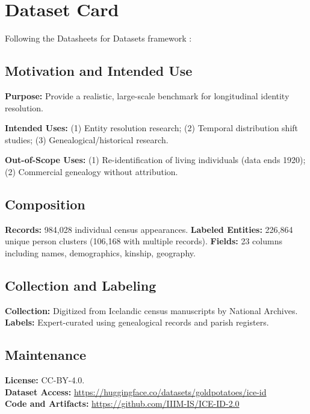 \documentclass{article}
\begin{document}


\section{Dataset Card}
\label{sec:dataset_card}

Following the Datasheets for Datasets framework \cite{gebru2021datasheets, Bender2018DataSF, Mitchell2018ModelCF}:

\subsection{Motivation and Intended Use}
\textbf{Purpose:} Provide a realistic, large-scale benchmark for longitudinal identity resolution.

\textbf{Intended Uses:} (1) Entity resolution research; (2) Temporal distribution shift studies; (3) Genealogical/historical research.

\textbf{Out-of-Scope Uses:} (1) Re-identification of living individuals (data ends 1920); (2) Commercial genealogy without attribution.

\subsection{Composition}
\textbf{Records:} 984,028 individual census appearances.
\textbf{Labeled Entities:} 226,864 unique person clusters (106,168 with multiple records).
\textbf{Fields:} 23 columns including names, demographics, kinship, geography.

\subsection{Collection and Labeling}
\textbf{Collection:} Digitized from Icelandic census manuscripts by National Archives.
\textbf{Labels:} Expert-curated using genealogical records and parish registers.

\subsection{Maintenance}
\textbf{License:} CC-BY-4.0. \\
\textbf{Dataset Access:} \url{https://huggingface.co/datasets/goldpotatoes/ice-id} \\
\textbf{Code and Artifacts:} \url{https://github.com/IIIM-IS/ICE-ID-2.0}
\end{document}
